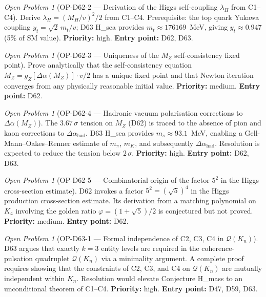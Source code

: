 \documentclass[11pt,a4paper]{article}
\theoremstyle{plain}
\theoremstyle{definition}
\theoremstyle{remark}
\newtheorem{openproblem}[theorem]{Open Problem}
\begin{document}
\begin{openproblem}[OP-D62-2 --- Derivation of the Higgs self-coupling $\lambda_H$ from C1--C4]
\label{op:D62two}
Derive $\lambda_H = (M_H/v)^2/2$ from C1--C4. Prerequisite: the top quark Yukawa coupling $y_t = \sqrt{2}\,m_t/v$; D63 H\_sea provides $m_t \approx 176169$~MeV, giving $y_t \approx 0.947$ (5\% of SM value). \textbf{Priority:} high. \textbf{Entry point:} D62, D63.
\end{openproblem}

\begin{openproblem}[OP-D62-3 --- Uniqueness of the $M_Z$ self-consistency fixed point]
\label{op:D62three}
Prove analytically that the self-consistency equation $M_Z = g_Z[\Delta\alpha(M_Z)]\cdot v/2$ has a unique fixed point and that Newton iteration converges from any physically reasonable initial value. \textbf{Priority:} medium. \textbf{Entry point:} D62.
\end{openproblem}

\begin{openproblem}[OP-D62-4 --- Hadronic vacuum polarisation corrections to $\Delta\alpha(M_Z)$]
\label{op:D62four}
The $3.67\,\sigma$ tension on $M_Z$ (D62) is traced to the absence of pion and kaon corrections to $\Delta\alpha_{\mathrm{had}}$. D63 H\_sea provides $m_s \approx 93.1$~MeV, enabling a Gell-Mann--Oakes--Renner estimate of $m_\pi$, $m_K$, and subsequently $\Delta\alpha_{\mathrm{had}}$. Resolution is expected to reduce the tension below $2\,\sigma$. \textbf{Priority:} high. \textbf{Entry point:} D62, D63.
\end{openproblem}

\begin{openproblem}[OP-D62-5 --- Combinatorial origin of the factor $5^2$ in the Higgs cross-section estimate]
\label{op:D62five}
D62 invokes a factor $5^2 = (\sqrt{5})^4$ in the Higgs production cross-section estimate. Its derivation from a matching polynomial on $K_4$ involving the golden ratio $\varphi = (1+\sqrt{5})/2$ is conjectured but not proved. \textbf{Priority:} medium. \textbf{Entry point:} D62.
\end{openproblem}

\begin{openproblem}[OP-D63-1 --- Formal independence of C2, C3, C4 in $\mathcal{Q}(K_n)$]
\label{op:D63one}
D63 argues that exactly $k=3$ entity levels are required in the coherence-pulsation quadruplet $\mathcal{Q}(K_n)$ via a minimality argument. A complete proof requires showing that the constraints of C2, C3, and C4 on $\mathcal{Q}(K_n)$ are mutually independent within $K_n$. Resolution would elevate Conjecture H\_mass to an unconditional theorem of C1--C4. \textbf{Priority:} high. \textbf{Entry point:} D47, D59, D63.
\end{openproblem}
\end{document}
